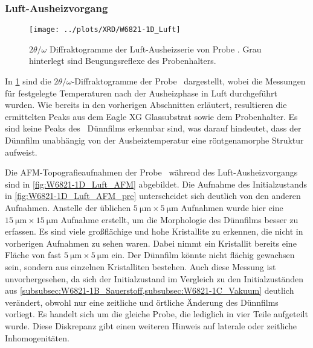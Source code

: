 \subsubsection{Luft-Aus\-heiz\-vor\-gang}\label{subsubsec:W6821-1D_Luft}
\begin{figure}
    \centering
    \texttt{[image: ../plots/XRD/W6821-1D\_Luft]}
    \caption{$2\theta/\omega$ Diffraktogramme der Luft-Ausheizserie von Probe \sampleone.
    Grau hinterlegt sind Beugungsreflexe des Probenhalters.}
    \label{fig:W6821-1D_Luft_XRD}
\end{figure}
In \cref{fig:W6821-1D_Luft_XRD} sind die $2\theta/\omega$-Diffraktogramme der Probe \sampleone\ dargestellt,
wobei die Messungen für festgelegte Temperaturen nach der Ausheizphase in Luft durchgeführt wurden.
Wie bereits in den vorherigen Abschnitten erläutert, resultieren die ermittelten Peaks aus dem Eagle XG Glassubstrat
sowie dem Probenhalter.
Es sind keine Peaks des \heo\ Dünnfilms erkennbar sind, was darauf hindeutet, dass der Dünnfilm unabhängig von der
Ausheiztemperatur eine röntgenamorphe Struktur aufweist.

Die AFM-Topografieaufnahmen der Probe \sampleone\ während des Luft-Aus\-heiz\-vor\-gangs sind in \cref{fig:W6821-1D_Luft_AFM}
abgebildet.
Die Aufnahme des Initialzustands in \cref{fig:W6821-1D_Luft_AFM_pre}
unterscheidet sich deutlich von den anderen Aufnahmen.
Anstelle der üblichen $\qty{5}{\micro\meter} \times \qty{5}{\micro\meter}$ Aufnahmen wurde hier eine
$\qty{15}{\micro\meter} \times \qty{15}{\micro\meter}$ Aufnahme erstellt, um die Morphologie des Dünnfilms besser zu
erfassen.
Es sind viele großflächige und hohe Kristallite zu erkennen, die nicht in vorherigen Aufnahmen zu sehen waren.
Dabei nimmt ein Kristallit bereits eine Fläche von fast $\qty{5}{\micro\meter} \times \qty{5}{\micro\meter}$ ein.
Der Dünnfilm könnte nicht flächig gewachsen sein, sondern aus einzelnen Kristalliten bestehen.
Auch diese Messung ist unvorhergesehen, da sich der Initialzustand im Vergleich zu den Initialzuständen aus
\cref{subsubsec:W6821-1B_Sauerstoff,subsubsec:W6821-1C_Vakuum} deutlich verändert, obwohl nur eine zeitliche
und örtliche Änderung des Dünnfilms vorliegt.
Es handelt sich um die gleiche Probe, die lediglich in vier Teile aufgeteilt wurde.
Diese Diskrepanz gibt einen weiteren Hinweis auf laterale oder zeitliche Inhomogenitäten.

